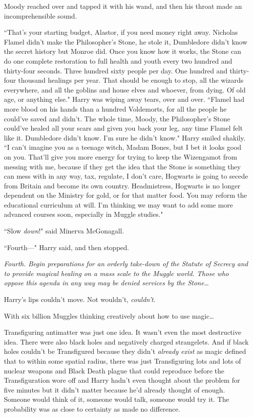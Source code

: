 Moody reached over and tapped it with his wand, and then his throat made an incomprehensible sound.

``That's your starting budget, Alastor, if you need money right away. Nicholas Flamel didn't make the Philosopher's Stone, he stole it, Dumbledore didn't know the secret history but Monroe did. Once you know how it works, the Stone can do one complete restoration to full health and youth every two hundred and thirty-four seconds. Three hundred sixty people per day. One hundred and thirty-four thousand healings per year. That should be enough to stop, all the wizards everywhere, and all the goblins and house elves and whoever, from dying. Of old age, or anything else." Harry was wiping away tears, over and over. ``Flamel had more blood on his hands than a hundred Voldemorts, for all the people he could've saved and didn't. The whole time, Moody, the Philosopher's Stone could've healed all your scars and given you back your leg, any time Flamel felt like it. Dumbledore didn't know. I'm sure he didn't know." Harry smiled shakily. ``I can't imagine you as a teenage witch, Madam Bones, but I bet it looks good on you. That'll give you more energy for trying to keep the Wizengamot from messing with me, because if they get the idea that the Stone is something they can mess with in any way, tax, regulate, I don't care, Hogwarts is going to secede from Britain and become its own country. Headmistress, Hogwarts is no longer dependent on the Ministry for gold, or for that matter food. You may reform the educational curriculum at will. I'm thinking we may want to add some more advanced courses soon, especially in Muggle studies."

``Slow \emph{down}!" said Minerva McGonagall.

``Fourth—" Harry said, and then stopped.

\emph{Fourth. Begin preparations for an orderly take-down of the Statute of Secrecy and to provide magical healing on a mass scale to the Muggle world. Those who oppose this agenda in any way may be denied services by the Stone{\ldots}}

Harry's lips couldn't move. Not wouldn't, \emph{couldn't}.

With six billion Muggles thinking creatively about how to use magic{\ldots}

Transfiguring antimatter was just one idea. It wasn't even the most destructive idea. There were also black holes and negatively charged strangelets. And if black holes couldn't be Transfigured because they didn't \emph{already exist} as magic defined that to within some spatial radius, there was just Transfiguring lots and lots of nuclear weapons and Black Death plague that could reproduce before the Transfiguration wore off and Harry hadn't even thought about the problem for five minutes but it didn't matter because he'd already thought of enough. Someone would think of it, someone would talk, someone would try it. The probability was as close to certainty as made no difference.

